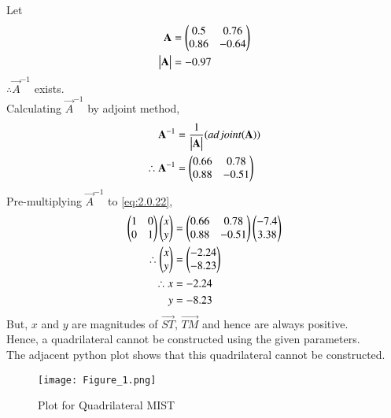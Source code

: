 \documentclass[journal,12pt,twocolumn]{IEEEtran}
\begin{document}
Let
\begin{align}
    \mathbf{A} &= \begin{pmatrix}0.5 & 0.76\\ 0.86 & -0.64\end{pmatrix}\\
    \begin{vmatrix}\mathbf{A}\end{vmatrix} &= -0.97
\end{align}
$\therefore \vec{A}^{-1}$ exists. 
\\Calculating $\vec{A}^{-1}$ by adjoint method,
\begin{align}
    \mathbf{A}^{-1} &= \dfrac{1}{\begin{vmatrix}\mathbf{A}\end{vmatrix}}(adjoint(\mathbf{A}))\\
    \therefore \mathbf{A}^{-1} &= \begin{pmatrix}0.66 & 0.78\\ 0.88 & -0.51\end{pmatrix}
\end{align}
Pre-multiplying $\vec{A}^{-1}$ to \eqref{eq:2.0.22},
\begin{align}
   \begin{pmatrix}1 & 0\\0 & 1\end{pmatrix} \begin{pmatrix}x\\y\end{pmatrix} &= \begin{pmatrix}0.66 & 0.78\\ 0.88 & -0.51\end{pmatrix} \begin{pmatrix}-7.4\\3.38\end{pmatrix}\\
    \therefore \begin{pmatrix}x \\ y\end{pmatrix} &= \begin{pmatrix}-2.24\\-8.23\end{pmatrix}\\
    \therefore x &= -2.24\\
    y &= -8.23
\end{align}
But, $x$ and $y$ are magnitudes of $\vec{ST}$, $\vec{TM}$ and hence are always positive.\\
Hence, a quadrilateral cannot be constructed using the given parameters.
\\The adjacent python plot shows that this quadrilateral cannot be constructed.
\begin{figure}[h]
    \centering
    \texttt{[image: Figure\_1.png]}
    \caption{Plot for Quadrilateral MIST}
    \label{fig:my_label}
\end{figure}
\end{document}
